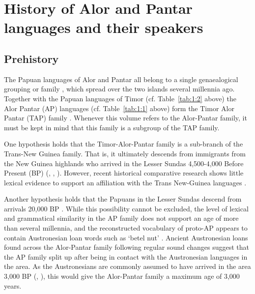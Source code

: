 \section{History of Alor and Pantar languages and their speakers}\label{sec:1:4}

\subsection{Prehistory}\label{sec:1:4.1}
The Papuan languages of Alor and Pantar all belong to a single genaealogical grouping or family \citep{HoltonEtAl2012,HoltonRobinsonTVhistory}, which spread over the two islands several millennia ago. Together with the Papuan languages of Timor (cf. Table~\ref{tab:1:2} above) the Alor Pantar (AP) languages (cf. Table~\ref{tab:1:1} above) form the Timor Alor Pantar (TAP) family \citep{SchapperEtAlTVtimor}. Whenever this volume refers to the Alor-Pantar family, it must be kept in mind that this family is a subgroup of the TAP family. 

One hypothesis holds that the Timor-Alor-Pantar family is a sub-branch of the Trans-New Guinea family. That is, it ultimately descends from immigrants from the New Guinea highlands who arrived in the Lesser Sundas 4,500-4,000 Before Present (BP) (\citealt[123]{Bellwood1997}, \citealt[42]{Ross2005}, \citealt{Pawley2005}). However, recent historical comparative research \citep{RobinsonEtAl2012internal,HoltonRobinsonTVposition} shows little lexical evidence to support an affiliation with the Trans New-Guinea languages \citep[cf.][]{WurmEtAl1975,Ross2005}.

Another hypothesis holds that the Papuans in the Lesser Sundas descend from arrivals 20,000 BP \citep{Summerhayes2007}. While this possibility cannot be excluded, the level of lexical and grammatical similarity in the AP family does not support an age of more than several millennia, and the reconstructed vocabulary of proto-AP appears to contain Austronesian loan words such as  `betel nut' \citep{HoltonEtAl2012,Robinsontaalorpantar}. Ancient Austronesian loans found across the Alor-Pantar family following regular sound changes suggest that the AP family split up after being in contact with the Austronesian languages in the area. As the Austronesians are commonly assumed to have arrived in the area {\Tilde}3,000 BP (\citealt[100]{Pawley2005},  \citealt{Spriggs2011}), this would give the Alor-Pantar family a maximum age of {\Tilde}3,000 years.

